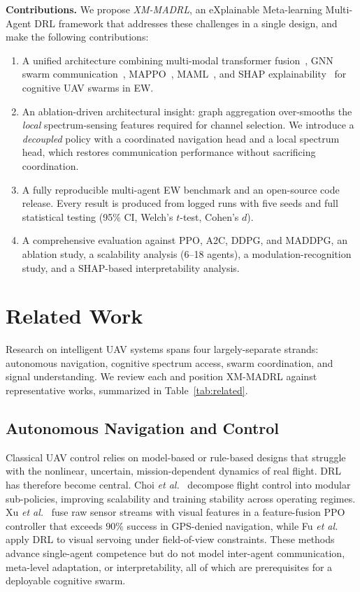 \documentclass[journal]{IEEEtran}
\begin{document}
\textbf{Contributions.} We propose \emph{XM-MADRL}, an eXplainable
Meta-learning Multi-Agent DRL framework that addresses these challenges in a
single design, and make the following contributions:
\begin{enumerate}
\item A unified architecture combining multi-modal transformer
fusion~\cite{vaswani2017attention}, GNN swarm
communication~\cite{kipf2017semi}, MAPPO~\cite{yu2022surprising},
MAML~\cite{finn2017model}, and SHAP explainability~\cite{lundberg2017unified}
for cognitive UAV swarms in EW.
\item An ablation-driven architectural insight: graph aggregation over-smooths
the \emph{local} spectrum-sensing features required for channel selection. We
introduce a \emph{decoupled} policy with a coordinated navigation head and a
local spectrum head, which restores communication performance without
sacrificing coordination.
\item A fully reproducible multi-agent EW benchmark and an open-source code
release. Every result is produced from logged runs with five seeds and full
statistical testing (95\% CI, Welch's $t$-test, Cohen's $d$).
\item A comprehensive evaluation against PPO, A2C, DDPG, and MADDPG, an ablation
study, a scalability analysis (6--18 agents), a modulation-recognition study, and
a SHAP-based interpretability analysis.
\end{enumerate}

\section{Related Work}
Research on intelligent UAV systems spans four largely-separate strands:
autonomous navigation, cognitive spectrum access, swarm coordination, and signal
understanding. We review each and position XM-MADRL against representative works,
summarized in Table~\ref{tab:related}.

\subsection{Autonomous Navigation and Control}
Classical UAV control relies on model-based or rule-based designs that struggle
with the nonlinear, uncertain, mission-dependent dynamics of real flight.
DRL has therefore become central. Choi \emph{et al.}~\cite{choi2023modular}
decompose flight control into modular sub-policies, improving scalability and
training stability across operating regimes. Xu \emph{et al.}~\cite{xu2023multiuav}
fuse raw sensor streams with visual features in a feature-fusion PPO controller
that exceeds $90\%$ success in GPS-denied navigation, while Fu
\emph{et al.}~\cite{fu2023deep} apply DRL to visual servoing under
field-of-view constraints. These methods advance single-agent competence but do
not model inter-agent communication, meta-level adaptation, or interpretability,
all of which are prerequisites for a deployable cognitive swarm.
\end{document}
